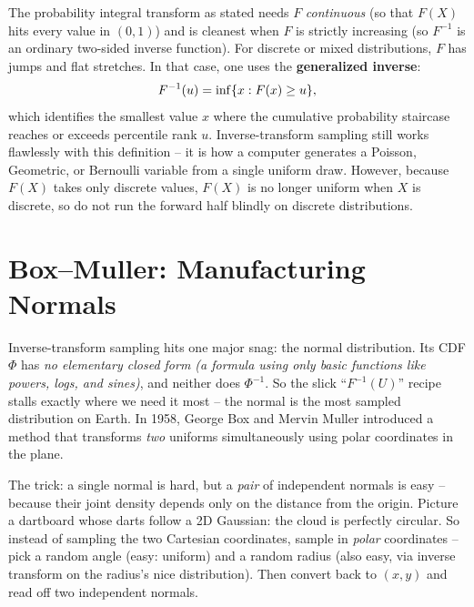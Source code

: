 \begin{trapbox}
The probability integral transform as stated needs $F$ \emph{continuous} (so that $F(X)$
hits every value in $(0,1)$) and is cleanest when $F$ is strictly increasing (so $F^{-1}$
is an ordinary two-sided inverse function). For discrete or mixed distributions, $F$ has
jumps and flat stretches. In that case, one uses the \textbf{generalized inverse}:
\[
  F^{-1}(u) = \inf\{x : F(x) \ge u\},
\]
which identifies the smallest value $x$ where the cumulative probability staircase reaches or
exceeds percentile rank $u$. Inverse-transform sampling still works flawlessly with this
definition -- it is how a computer generates a Poisson, Geometric, or Bernoulli variable
from a single uniform draw. However, because $F(X)$ takes only discrete values, $F(X)$ is no
longer uniform when $X$ is discrete, so do not run the forward half blindly on discrete
distributions.
\end{trapbox}

\section{Box--Muller: Manufacturing Normals}
\label{ch16:box-muller}

Inverse-transform sampling hits one major snag: the normal distribution. Its CDF $\Phi$ has
\emph{no elementary closed form (a formula using only basic functions like powers, logs, and sines)}, and neither does $\Phi^{-1}$. So the slick
``$F^{-1}(U)$'' recipe stalls exactly where we need it most -- the normal is the most
sampled distribution on Earth. In 1958, George Box and Mervin Muller introduced a method that transforms \emph{two} uniforms simultaneously using polar coordinates in the plane.

\begin{intuitionbox}
The trick: a single normal is hard, but a \emph{pair} of independent normals is easy --
because their joint density depends only on the distance from the origin. Picture a
dartboard whose darts follow a 2D Gaussian: the cloud is perfectly circular. So instead of
sampling the two Cartesian coordinates, sample in \emph{polar} coordinates -- pick a random
angle (easy: uniform) and a random radius (also easy, via inverse transform on the radius's
nice distribution). Then convert back to $(x,y)$ and read off two independent normals.
\end{intuitionbox}

